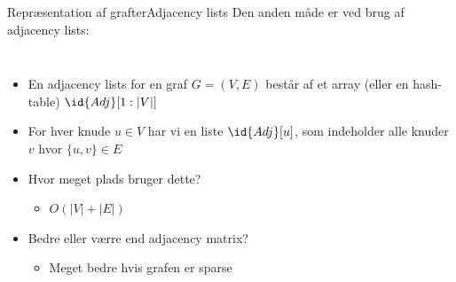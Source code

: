\documentclass[aspectratio=1610]{beamer}
\begin{document}
\begin{frame}{Repræsentation af grafter}{Adjacency lists}
    Den anden måde er ved brug af \alert{adjacency lists}:

    \begin{columns}
        \begin{itemize}[<+(1)->]
            \item En adjacency lists for en graf $G = (V,E)$ består af et array
                (eller en hash-table) $\id{Adj}[1:|V|]$
            \item For hver knude $u \in V$ har vi en liste $\id{Adj}[u]$, som
                indeholder alle knuder $v$ hvor $\{u,v\} \in E$
            \item Hvor meget plads bruger dette?
                \begin{itemize}
                    \item $O(|V| + |E|)$
                \end{itemize}
            \item Bedre eller værre end adjacency matrix?
                \begin{itemize}
                    \item Meget bedre hvis grafen er sparse
                \end{itemize}
        \end{itemize}


\end{columns}
\end{frame}
\end{document}
